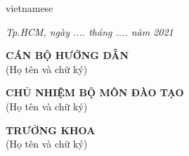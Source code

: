 \begin{titlepage}
\begin{otherlanguage*}{vietnamese}
    \begin{flushright}
        \textit{Tp.HCM, ngày .... tháng .... năm 2021}
    \end{flushright}

    \begin{center}
        \begin{minipage}[t]{0.40\textwidth}
            \center\textbf{CÁN BỘ HƯỚNG DẪN}\\
            (Họ tên và chữ ký)
            \vspace{3cm}
        \end{minipage}
        \noindent
        \begin{minipage}[t]{0.50\textwidth}
            \center\textbf{CHỦ NHIỆM BỘ MÔN ĐÀO TẠO}\\
            (Họ tên và chữ ký)
            \vspace{3cm}
        \end{minipage}
        \begin{minipage}[t]{0.90\textwidth}
            \center\textbf{TRƯỞNG KHOA}\\
            (Họ tên và chữ ký)
            \vspace{3cm}
        \end{minipage}
    \end{center}

\end{otherlanguage*}
\vfill
\end{titlepage}
